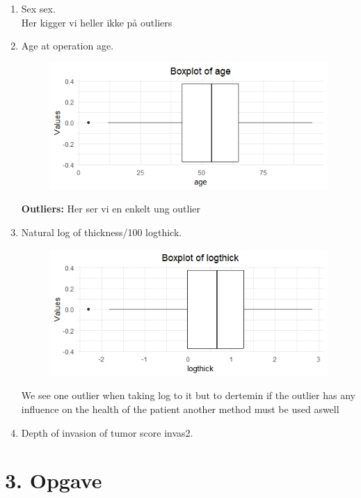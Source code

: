 \begin{enumerate}
\item Sex sex.\\
Her kigger vi heller ikke på outliers
\item Age at operation age.\\
\begin{figure}
    \centering
    \includegraphics[width=0.5\linewidth]{Project/BIlleder_Duration/Age_Outliers.jpeg}
\end{figure}
\textbf{Outliers: }Her ser vi en enkelt ung outlier 
\item Natural log of thickness/100 logthick.\\
\begin{figure}
    \centering
    \includegraphics[width=0.5\linewidth]{Project/BIlleder_Duration/logthickness_Outlier.jpeg}
\end{figure}
We see one outlier when taking log to it but to dertemin if the outlier has any influence on the health of the patient another method must be used aswell
\item Depth of invasion of tumor score invas2.
\end{enumerate}



\chapter{3. Opgave}
